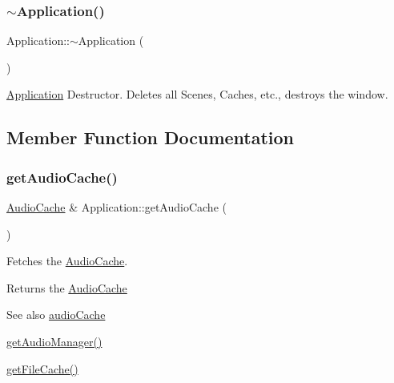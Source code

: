 \subsubsection{\texorpdfstring{$\sim$Application()}{~Application()}}
{\footnotesize\ttfamily Application\+::$\sim$\+Application (\begin{DoxyParamCaption}{ }\end{DoxyParamCaption})}



\mbox{\hyperlink{classsage_1_1Application}{Application}} Destructor. Deletes all Scenes, Caches, etc., destroys the window. 



\subsection{Member Function Documentation}
\mbox{\label{classsage_1_1Application_a68d5ca5d6fd24fa3ec8354e8ec62227a}} 
\subsubsection{\texorpdfstring{getAudioCache()}{getAudioCache()}}
{\footnotesize\ttfamily \mbox{\hyperlink{classsage_1_1AudioCache}{Audio\+Cache}} \& Application\+::get\+Audio\+Cache (\begin{DoxyParamCaption}{ }\end{DoxyParamCaption})}



Fetches the \mbox{\hyperlink{classsage_1_1AudioCache}{Audio\+Cache}}. 

\begin{DoxyReturn}{Returns}
the \mbox{\hyperlink{classsage_1_1AudioCache}{Audio\+Cache}} 
\end{DoxyReturn}
\begin{DoxySeeAlso}{See also}
\mbox{\hyperlink{classsage_1_1Application_a84a266e1a477f1c82d36e4cb5c2feab8}{audio\+Cache}} 

\mbox{\hyperlink{classsage_1_1Application_a717c0e8323d219589975f607ab561462}{get\+Audio\+Manager()}} 

\mbox{\hyperlink{classsage_1_1Application_adaacf80b3ecc3efdd4696b869ca3aedd}{get\+File\+Cache()}} 
\end{DoxySeeAlso}
\mbox{\label{classsage_1_1Application_a717c0e8323d219589975f607ab561462}} 
